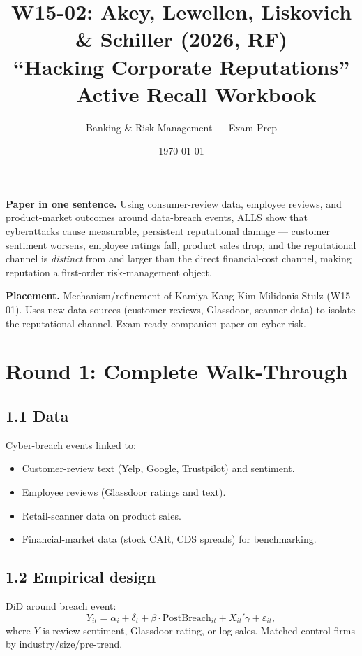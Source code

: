 \documentclass[11pt]{article}
\title{W15-02: Akey, Lewellen, Liskovich \& Schiller (2026, RF) \\
\large ``Hacking Corporate Reputations'' --- Active Recall Workbook}
\author{Banking \& Risk Management --- Exam Prep}
\date{\today}
\begin{document}
\maketitle

\begin{keybox}
\textbf{Paper in one sentence.} Using consumer-review data, employee reviews, and product-market outcomes around data-breach events, ALLS show that cyberattacks cause measurable, persistent reputational damage --- customer sentiment worsens, employee ratings fall, product sales drop, and the reputational channel is \emph{distinct} from and larger than the direct financial-cost channel, making reputation a first-order risk-management object.

\textbf{Placement.} Mechanism/refinement of Kamiya-Kang-Kim-Milidonis-Stulz (W15-01). Uses new data sources (customer reviews, Glassdoor, scanner data) to isolate the reputational channel. Exam-ready companion paper on cyber risk.
\end{keybox}

\section*{Round 1: Complete Walk-Through}

\subsection*{1.1 Data}
Cyber-breach events linked to:
\begin{itemize}
\item Customer-review text (Yelp, Google, Trustpilot) and sentiment.
\item Employee reviews (Glassdoor ratings and text).
\item Retail-scanner data on product sales.
\item Financial-market data (stock CAR, CDS spreads) for benchmarking.
\end{itemize}

\subsection*{1.2 Empirical design}
DiD around breach event:
\[
Y_{it}=\alpha_i+\delta_t+\beta\cdot\text{PostBreach}_{it}+X_{it}'\gamma+\varepsilon_{it},
\]
where $Y$ is review sentiment, Glassdoor rating, or log-sales. Matched control firms by industry/size/pre-trend.
\end{document}
